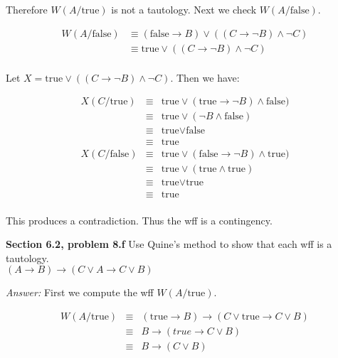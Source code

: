 \documentclass[12pt]{article}
\begin{document}
Therefore $W(A/\text{true})$ is not a tautology.  Next we check $W(A/\text{false})$.

\begin{center}
\begin{eqnarray*}
W(A/\text{false}) & \equiv (\text{false} \rightarrow B) \lor ((C
\rightarrow \neg B) \land \neg C) \\ 
& \equiv \text{true} \lor ((C \rightarrow \neg B) \land \neg C)  \\
\end{eqnarray*}
\end{center}

Let $ X = \text{true} \lor ((C \rightarrow \neg B) \land \neg C).$ Then we have:

\begin{center}
\begin{eqnarray*}
X(C/\text{true}) & \equiv & \text{true} \lor (\text{true} 
\rightarrow \neg B) \land \text{false}) \\
& \equiv & \text{true} \lor (\neg B \land \text{false}) \\
& \equiv & \text{true} \lor \text{false} \\
& \equiv & \text{true} \\
X(C/\text{false}) & \equiv & \text{true} \lor (\text{false} 
\rightarrow \neg B) \land \text{true}) \\
& \equiv & \text{true} \lor (\text{true} \land \text{true}) \\
& \equiv & \text{true} \lor \text{true} \\
& \equiv & \text{true} \\
\end{eqnarray*}
\end{center}

This produces a contradiction. Thus the wff is a contingency.

\textbf{Section 6.2, problem 8.f} Use Quine's method to show that each wff is a tautology. \\
$(A\rightarrow B) \rightarrow (C \lor A \rightarrow C \lor B)$

\emph{Answer:} First we compute the wff $W(A/\text{true})$.

\begin{center}
\begin{eqnarray*}
W(A/\text{true}) & \equiv & (\text{true}\rightarrow B) 
\rightarrow (C \lor \text{true} \rightarrow C \lor B) \\ 
& \equiv & B \rightarrow (true \rightarrow  C \lor B) \\ 
& \equiv & B \rightarrow (C \lor B)
\end{eqnarray*}
\end{center}
\end{document}
